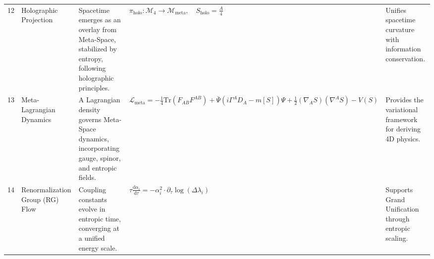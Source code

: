 \documentclass[10.5pt,a4paper]{article}
\begin{document}
{\begin{longtable}{r p{3.5cm} p{6cm} p{5cm} p{5cm}}
12 & Holographic Projection & Spacetime emerges as an overlay from Meta-Space, stabilized by entropy, following holographic principles. & 
\( \pi_{\text{holo}}: \mathcal{M}_4 \rightarrow \mathcal{M}_{\text{meta}}, \quad S_{\text{holo}} = \frac{A}{4} \) & Unifies spacetime curvature with information conservation. \\

13 & Meta-Lagrangian Dynamics & A Lagrangian density governs Meta-Space dynamics, incorporating gauge, spinor, and entropic fields. & 
\(
\mathcal{L}_{\text{meta}} = -\frac{1}{4} \mathrm{Tr}(F_{AB}F^{AB}) + \bar{\Psi}(i\Gamma^A D_A - m[S])\Psi + \frac{1}{2}(\nabla_A S)(\nabla^A S) - V(S)
\) & Provides the variational framework for deriving 4D physics. \\

14 & Renormalization Group (RG) Flow & Coupling constants evolve in entropic time, converging at a unified energy scale. & 
\( \tau \frac{\mathrm{d}\alpha_i}{\mathrm{d}\tau} = -\alpha_i^2 \cdot \partial_\tau \log(\Delta\lambda_i) \) & Supports Grand Unification through entropic scaling. \\

\end{longtable}
}
\end{document}
